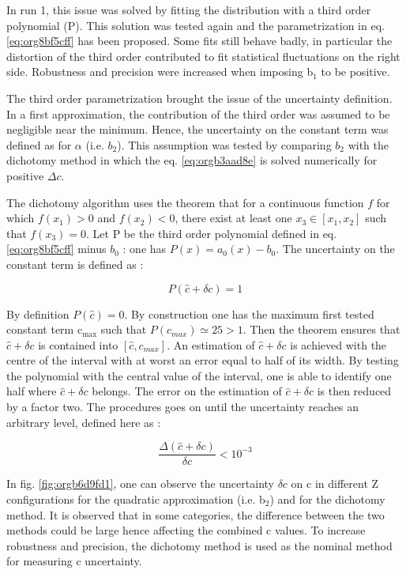 In run 1, this issue was solved by fitting the distribution with a third order polynomial (P).
This solution was tested again and the para\-metri\-zation in eq. \ref{eq:org8bf5cff} has been proposed.
Some fits still behave badly, in particular the distortion of the third order contributed to fit statistical fluctuations  on the right side.
Robustness and precision were increased when imposing b\(_{\text{1}}\) to be positive.

The third order parametrization brought the issue of the uncertainty definition.
In a first approximation, the contribution of the third order was assumed to be negligible near the minimum.
Hence, the uncertainty on the constant term was defined as for \(\alpha\) (i.e. $b_2$).
This assumption was tested by comparing $b_2$ with the dichotomy method in which the eq. \ref{eq:orgb3aad8e} is solved numerically for positive $\Delta c$.


The dichotomy algorithm uses the theorem that for a continuous function $f$ for which $f(x_1)>0$ and $f(x_2)<0$, there exist at least one $x_3\in[x_1,x_2]$ such that $f(x_3)=0$.
Let P be the third order polynomial defined in eq. \ref{eq:org8bf5cff} minus $b_0$ : one has $P(x)=a_0(x)-b_0$.
The uncertainty on the constant term is defined as :

\begin{equation}
P( \hat{c} + \delta c) = 1
\end{equation}

By definition \(P(\hat{c})=0\).
By construction one has the maximum first tested constant term c\(_{\text{max}}\) such that \(P(c_{max})\simeq 25 > 1\).
Then the theorem ensures that \(\hat{c}+\delta c\) is contained into \([\hat{c}, c_{max}]\).
An estimation of \(\hat{c}+\delta c\) is achieved with the centre of the interval with at worst an error equal to half of its width.
By testing the polynomial with the central value of the interval, one is able to identify one half where \(\hat{c}+\delta c\) belongs.
The error on the estimation of \(\hat{c}+\delta c\) is then reduced by a factor two.
The procedures goes on until the uncertainty reaches an arbitrary level, defined here as :

\begin{equation}
\frac{\Delta (\hat{c}+\delta c)}{\delta c} < 10^{-3}
\end{equation}

In fig. \ref{fig:orgb6d9fd1}, one can observe the uncertainty \(\delta c\) on c in different Z configurations for the quadratic approximation (i.e. b\(_{\text{2}}\)) and for the dichotomy method.
It is observed that in some categories, the difference between the two methods could be large hence affecting the combined c values.
To increase robustness and precision, the dichotomy method is used as the nominal method for measuring c uncertainty.


